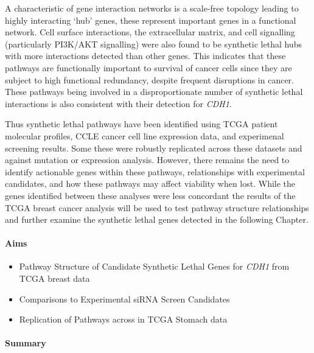 A characteristic of gene interaction networks is a scale-free topology leading to highly interacting ‘hub’ genes, these represent important genes in a functional network. Cell surface interactions, the extracellular matrix, and cell signalling (particularly PI3K/AKT signalling) were also found to be synthetic lethal hubs with more interactions detected than other genes. This indicates that these pathways are functionally important to survival of cancer cells since they are subject to high functional redundancy, despite frequent disruptions in cancer. These pathways being involved in a disproportionate number of synthetic lethal interactions is also consistent with their detection for \textit{CDH1}.

Thus synthetic lethal pathways have been identified using TCGA patient molecular profiles, CCLE cancer cell line expression data, and experimenal screening results. Some these were robustly replicated across these datasets and against  mutation or expression analysis. However, there remains the need to identify actionable genes within these pathways, relationships with experimental candidates, and how these pathways may affect viability when lost. While the genes identified between these analyses were less concordant the results of the TCGA breast cancer analysis will be used to test pathway structure relationships and further examine the synthetic lethal genes detected in the following Chapter.

\clearpage

\paragraph{Aims}

  \begin{itemize}
   \item Pathway Structure of Candidate Synthetic Lethal Genes for \textit{\textit{CDH1}} from TCGA breast data
   
   \bigskip
   
   \item Comparisons to Experimental siRNA Screen Candidates
   
   \bigskip
   
   \item Replication of Pathways across in TCGA Stomach data
  \end{itemize}

\paragraph{Summary}

